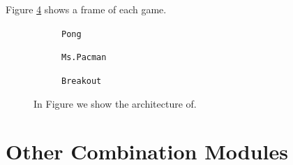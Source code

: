 Figure \ref{fig:environemnts} shows a frame of each game.
\begin{figure}[ht]
    \centering
    \begin{subfigure}[b]{0.30\textwidth}
        \centering
        \fbox{\rule[-.5cm]{0cm}{4cm} \rule[-.5cm]{4cm}{0cm}}
        \caption{\texttt{Pong}}
        \label{fig:pong_env}
    \end{subfigure}
    \hfill
    \begin{subfigure}[b]{0.30\textwidth}
        \centering
        \fbox{\rule[-.5cm]{0cm}{4cm} \rule[-.5cm]{4cm}{0cm}}
        \caption{\texttt{Ms.Pacman}}
        \label{fig:mspacman_env}
    \end{subfigure}
    \hfill
    \begin{subfigure}[b]{0.30\textwidth}
        \centering
        \fbox{\rule[-.5cm]{0cm}{4cm} \rule[-.5cm]{4cm}{0cm}}
        \caption{\texttt{Breakout}}
        \label{fig:breakout_env}
    \end{subfigure}
    \caption{In Figure we show the architecture of.}
    \label{fig:environemnts}
\end{figure}





























\section{Other Combination Modules}
\label{sec:combination_modules}

